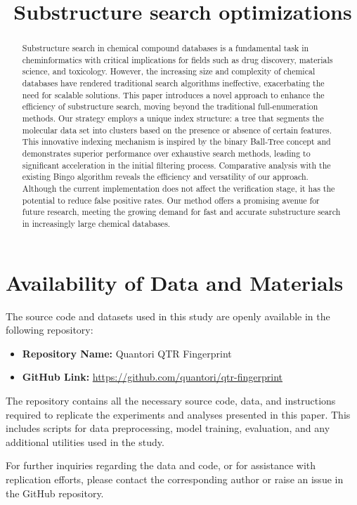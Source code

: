 \documentclass{article}
\title{Substructure search optimizations}
\begin{document}
\maketitle

\begin{abstract}
Substructure search in chemical compound databases is a fundamental task in cheminformatics with critical implications for fields such as drug discovery, materials science, and toxicology. However, the increasing size and complexity of chemical databases have rendered traditional search algorithms ineffective, exacerbating the need for scalable solutions. This paper introduces a novel approach to enhance the efficiency of substructure search, moving beyond the traditional full-enumeration methods. Our strategy employs a unique index structure: a tree that segments the molecular data set into clusters based on the presence or absence of certain features. This innovative indexing mechanism is inspired by the binary Ball-Tree concept and demonstrates superior performance over exhaustive search methods, leading to significant acceleration in the initial filtering process. Comparative analysis with the existing Bingo algorithm reveals the efficiency and versatility of our approach. Although the current implementation does not affect the verification stage, it has the potential to reduce false positive rates. Our method offers a promising avenue for future research, meeting the growing demand for fast and accurate substructure search in increasingly large chemical databases.
\end{abstract}

%





%

	
\section{Availability of Data and Materials}

The source code and datasets used in this study are openly available in the following repository:

\begin{itemize}
    \item \textbf{Repository Name:} Quantori QTR Fingerprint
    \item \textbf{GitHub Link:} \url{https://github.com/quantori/qtr-fingerprint}
\end{itemize}

The repository contains all the necessary source code, data, and instructions required to replicate the experiments and analyses presented in this paper. This includes scripts for data preprocessing, model training, evaluation, and any additional utilities used in the study.

For further inquiries regarding the data and code, or for assistance with replication efforts, please contact the corresponding author or raise an issue in the GitHub repository.



\end{document}
